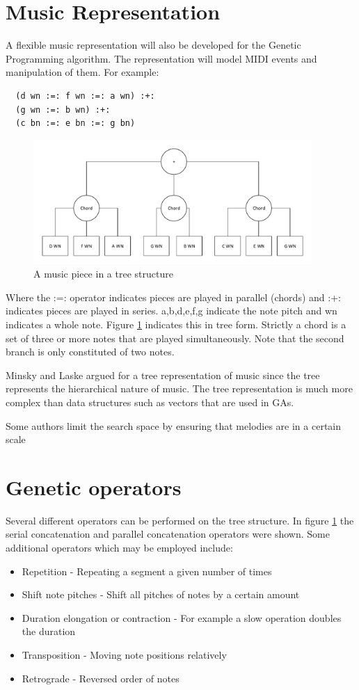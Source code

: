 \section{Music Representation}
A flexible music representation will also be developed for the Genetic Programming algorithm. The representation will model \ac{MIDI} events and manipulation of them.
For example:
\begin{lstlisting}
  (d wn :=: f wn :=: a wn) :+:
  (g wn :=: b wn) :+:
  (c bn :=: e bn :=: g bn)
\end{lstlisting}
\begin{figure}
\center
\includegraphics[width=400px]{../images/tree_stuct_piece.pdf}
\caption{A music piece in a tree structure}
\label{ims:musicpieceextrree}
\end{figure}
Where the :=: operator indicates pieces are played in parallel (chords) and :+: indicates pieces are played in series. a,b,d,e,f,g indicate the note pitch and wn indicates a whole note.
Figure \ref{ims:musicpieceextrree} indicates this in tree form. Strictly a chord is a set of three or more notes that are played simultaneously. Note that the second branch is only constituted of two notes.

Minsky and Laske \cite{Minsky1992} argued for a tree representation of music since the tree represents the hierarchical nature of music. The tree representation is much more complex than data structures such as vectors that are used in \acp{GA}.

Some authors \cite{Biles1994} limit the search space by ensuring that melodies are in a certain scale 

\section{Genetic operators}
Several different operators can be performed on the tree structure. In figure \ref{ims:musicpieceextrree} the serial concatenation and parallel concatenation operators were shown.
Some additional operators which may be employed include:
\begin{itemize}
\item Repetition - Repeating a segment a given number of times
\item Shift note pitches - Shift all pitches of notes by a certain amount
\item Duration elongation or contraction - For example a slow operation doubles the duration
\item Transposition - Moving note positions relatively
\item Retrograde - Reversed order of notes
\end{itemize}

